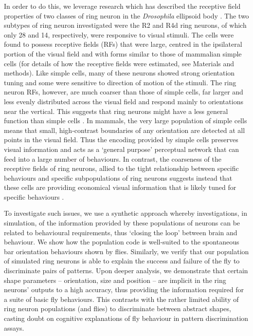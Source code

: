 In order to do this, we leverage research which has described the receptive field properties of two classes of ring neuron in the \emph{Drosophila} ellipsoid body \cite{Seelig2013}. The two subtypes of ring neuron investigated were the R2 and R4d ring neurons, of which only 28 and 14, respectively, were responsive to visual stimuli. The cells were found to possess receptive fields (\acp{RF}) that were large, centred in the ipsilateral portion of the visual field and with forms similar to those of mammalian simple cells \cite{Hubel1962} (for details of how the receptive fields were estimated, see Materials and methods). Like simple cells, many of these neurons showed strong orientation tuning and some were sensitive to direction of motion of the stimuli. The ring neuron \acp{RF}, however, are much coarser than those of simple cells, far larger and less evenly distributed across the visual field and respond mainly to orientations near the vertical. This suggests that ring neurons might have a less general function than simple cells \cite{Wystrach2014}. In mammals, the very large population of simple cells means that small, high-contrast boundaries of any orientation are detected at all points in the visual field. Thus the encoding provided by simple cells preserves visual information and acts as a `general purpose' perceptual network that can feed into a large number of behaviours. In contrast, the coarseness of the receptive fields of ring neurons, allied to the tight relationship between specific behaviours and specific subpopulations of ring neurons suggests instead that these cells are providing economical visual information that is likely tuned for specific behaviours \cite{Wystrach2014}.

To investigate such issues, we use a synthetic approach whereby investigations, in simulation, of the information provided by these populations of neurons can be related to behavioural requirements, thus `closing the loop' between brain and behaviour. We show how the population code is well-suited to the spontaneous bar orientation behaviours shown by flies. Similarly, we verify that our population of simulated ring neurons is able to explain the success and failure of the fly to discriminate pairs of patterns. Upon deeper analysis, we demonstrate that certain shape parameters -- orientation, size and position -- are implicit in the ring neurons' outputs to a high accuracy, thus providing the information required for a suite of basic fly behaviours. This contrasts with the rather limited ability of ring neuron populations (and flies) to discriminate between abstract shapes, casting doubt on cognitive explanations of fly behaviour in pattern discrimination assays.


